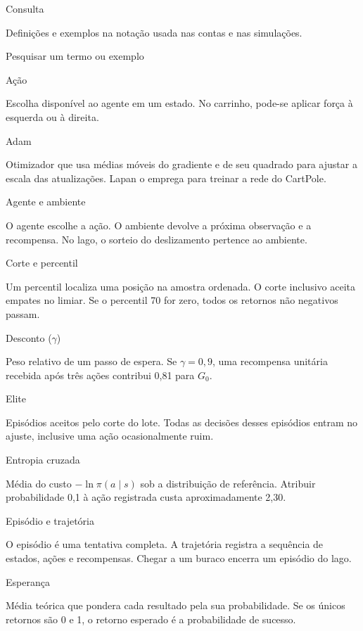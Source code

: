 Consulta

Definições e exemplos na notação usada nas contas e nas simulações.

Pesquisar um termo ou exemplo

Ação

Escolha disponível ao agente em um estado. No carrinho, pode-se aplicar força à esquerda ou à direita.

Adam

Otimizador que usa médias móveis do gradiente e de seu quadrado para ajustar a escala das atualizações. Lapan o emprega para treinar a rede do CartPole.

Agente e ambiente

O agente escolhe a ação. O ambiente devolve a próxima observação e a recompensa. No lago, o sorteio do deslizamento pertence ao ambiente.

Corte e percentil

Um percentil localiza uma posição na amostra ordenada. O corte inclusivo aceita empates no limiar. Se o percentil 70 for zero, todos os retornos não negativos passam.

Desconto ($\gamma$)

Peso relativo de um passo de espera. Se $\gamma=0{,}9$, uma recompensa unitária recebida após três ações contribui 0,81 para $G_0$.

Elite

Episódios aceitos pelo corte do lote. Todas as decisões desses episódios entram no ajuste, inclusive uma ação ocasionalmente ruim.

Entropia cruzada

Média do custo $-\ln\pi(a\mid s)$ sob a distribuição de referência. Atribuir probabilidade 0,1 à ação registrada custa aproximadamente 2,30.

Episódio e trajetória

O episódio é uma tentativa completa. A trajetória registra a sequência de estados, ações e recompensas. Chegar a um buraco encerra um episódio do lago.

Esperança

Média teórica que pondera cada resultado pela sua probabilidade. Se os únicos retornos são 0 e 1, o retorno esperado é a probabilidade de sucesso.

